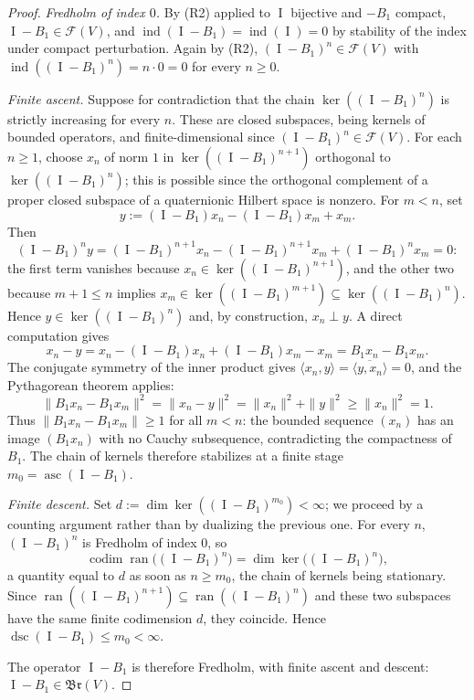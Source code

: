 \documentclass[10pt,a4paper]{amsart}
\newcommand{\Br}{\mathfrak{Br}}
\newcommand{\F}{\mathcal F}
\DeclareMathOperator{\Id}{I}
\newcommand{\V}{V}
\DeclareMathOperator{\asc}{asc}
\DeclareMathOperator{\codim}{codim}
\DeclareMathOperator{\dsc}{dsc}
\DeclareMathOperator{\ind}{ind}
\DeclareMathOperator{\ran}{ran}
\begin{document}
\begin{proof}
\emph{Fredholm of index $0$.} By (R2) applied to $\Id$ bijective and $-B_1$ compact, $\Id-B_1\in\F(\V)$, and $\ind(\Id-B_1)=\ind(\Id)=0$ by stability of the index under compact perturbation. Again by (R2), $(\Id-B_1)^n\in\F(\V)$ with $\ind((\Id-B_1)^n)=n\cdot0=0$ for every $n\ge0$.

\emph{Finite ascent.} Suppose for contradiction that the chain $\ker((\Id-B_1)^n)$ is strictly increasing for every $n$. These are closed subspaces, being kernels of bounded operators, and finite-dimensional since $(\Id-B_1)^n\in\F(\V)$. For each $n\ge1$, choose $x_n$ of norm $1$ in $\ker((\Id-B_1)^{n+1})$ orthogonal to $\ker((\Id-B_1)^n)$; this is possible since the orthogonal complement of a proper closed subspace of a quaternionic Hilbert space is nonzero. For $m<n$, set
\[
y:=(\Id-B_1)x_n-(\Id-B_1)x_m+x_m.
\]
Then
\[
(\Id-B_1)^n y=(\Id-B_1)^{n+1}x_n-(\Id-B_1)^{n+1}x_m+(\Id-B_1)^n x_m=0:
\]
the first term vanishes because $x_n\in\ker((\Id-B_1)^{n+1})$, and the other two because $m+1\le n$ implies $x_m\in\ker((\Id-B_1)^{m+1})\subseteq\ker((\Id-B_1)^n)$. Hence $y\in\ker((\Id-B_1)^n)$ and, by construction, $x_n\perp y$. A direct computation gives
\[
x_n-y=x_n-(\Id-B_1)x_n+(\Id-B_1)x_m-x_m=B_1x_n-B_1x_m.
\]
The conjugate symmetry of the inner product gives $\langle x_n,y\rangle=\overline{\langle y,x_n\rangle}=0$, and the Pythagorean theorem applies:
\[
\|B_1x_n-B_1x_m\|^2=\|x_n-y\|^2=\|x_n\|^2+\|y\|^2\ge\|x_n\|^2=1.
\]
Thus $\|B_1x_n-B_1x_m\|\ge1$ for all $m<n$: the bounded sequence $(x_n)$ has an image $(B_1x_n)$ with no Cauchy subsequence, contradicting the compactness of $B_1$. The chain of kernels therefore stabilizes at a finite stage $m_0=\asc(\Id-B_1)$.

\emph{Finite descent.} Set $d:=\dim\ker((\Id-B_1)^{m_0})<\infty$; we proceed by a counting argument rather than by dualizing the previous one. For every $n$, $(\Id-B_1)^n$ is Fredholm of index $0$, so
\[
\codim\ran\big((\Id-B_1)^n\big)=\dim\ker\big((\Id-B_1)^n\big),
\]
a quantity equal to $d$ as soon as $n\ge m_0$, the chain of kernels being stationary. Since $\ran((\Id-B_1)^{n+1})\subseteq\ran((\Id-B_1)^n)$ and these two subspaces have the same finite codimension $d$, they coincide. Hence $\dsc(\Id-B_1)\le m_0<\infty$.

The operator $\Id-B_1$ is therefore Fredholm, with finite ascent and descent: $\Id-B_1\in\Br(\V)$.
\end{proof}
\end{document}

